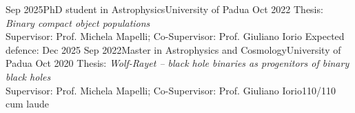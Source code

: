 %
%
%
\begin{experiences}
  \experiencetagsend
    {Sep 2025}{PhD student in Astrophysics}{University of Padua}
    {Oct 2022}
    {Thesis: \textit{Binary compact object populations} \\
    Supervisor: Prof. Michela Mapelli; Co-Supervisor: Prof. Giuliano Iorio }{Expected defence: Dec 2025
    }{}%
  \emptySeparator
  \experiencetagsend
    {Sep 2022}{Master in Astrophysics and Cosmology}{University of Padua}
    {Oct 2020} 
    {Thesis: \textit{Wolf-Rayet -- black hole binaries as progenitors of binary black holes} \\
    Supervisor: Prof. Michela Mapelli; Co-Supervisor: Prof. Giuliano Iorio}{110/110 cum laude}
    {}%
  \emptySeparator
  \experiencetagsend

\end{experiences}

